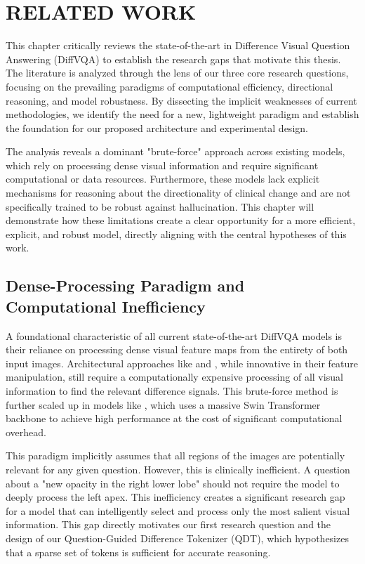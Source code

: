\setlength{\footskip}{8mm}

\chapter{RELATED WORK}
This chapter critically reviews the state-of-the-art in Difference Visual Question Answering (DiffVQA) to establish the research gaps that motivate this thesis. The literature is analyzed through the lens of our three core research questions, focusing on the prevailing paradigms of computational efficiency, directional reasoning, and model robustness. By dissecting the implicit weaknesses of current methodologies, we identify the need for a new, lightweight paradigm and establish the foundation for our proposed architecture and experimental design.

The analysis reveals a dominant "brute-force" approach across existing models, which rely on processing dense visual information and require significant computational or data resources. Furthermore, these models lack explicit mechanisms for reasoning about the directionality of clinical change and are not specifically trained to be robust against hallucination. This chapter will demonstrate how these limitations create a clear opportunity for a more efficient, explicit, and robust model, directly aligning with the central hypotheses of this work.

\section{Dense-Processing Paradigm and Computational Inefficiency}
A foundational characteristic of all current state-of-the-art DiffVQA models is their reliance on processing dense visual feature maps from the entirety of both input images. Architectural approaches like \cite{ekaid} and \cite{real}, while innovative in their feature manipulation, still require a computationally expensive processing of all visual information to find the relevant difference signals. This brute-force method is further scaled up in models like \cite{encoder-decoder}, which uses a massive Swin Transformer backbone to achieve high performance at the cost of significant computational overhead.

This paradigm implicitly assumes that all regions of the images are potentially relevant for any given question. However, this is clinically inefficient. A question about a "new opacity in the right lower lobe" should not require the model to deeply process the left apex. This inefficiency creates a significant research gap for a model that can intelligently select and process only the most salient visual information. This gap directly motivates our first research question and the design of our Question-Guided Difference Tokenizer (QDT), which hypothesizes that a sparse set of tokens is sufficient for accurate reasoning.

